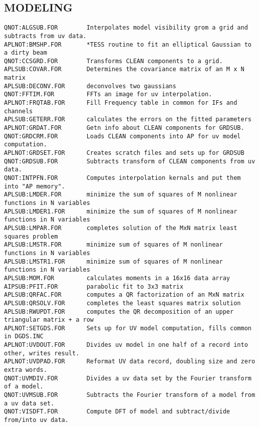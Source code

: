 \subsection{MODELING}
\begin{verbatim}
QNOT:ALGSUB.FOR        Interpolates model visibility grom a grid and subtracts from uv data.
APLNOT:BMSHP.FOR       *TESS routine to fit an elliptical Gaussian to a dirty beam
QNOT:CCSGRD.FOR        Transforms CLEAN components to a grid.
APLSUB:COVAR.FOR       Determines the covariance matrix of an M x N matrix
APLSUB:DECONV.FOR      deconvolves two gaussians
QNOT:FFTIM.FOR         FFTs an image for uv interpolation.
APLNOT:FRQTAB.FOR      Fill Frequency table in common for IFs and channels
APLSUB:GETERR.FOR      calculates the errors on the fitted parameters
APLNOT:GRDAT.FOR       Getn info about CLEAN components for GRDSUB.
QNOT:GRDCRM.FOR        Loads CLEAN components into AP for uv model computation.
APLNOT:GRDSET.FOR      Creates scratch files and sets up for GRDSUB
QNOT:GRDSUB.FOR        Subtracts transform of CLEAN components from uv data.
QNOT:INTPFN.FOR        Computes interpolation kernals and put them into "AP memory".
APLSUB:LMDER.FOR       minimize the sum of squares of M nonlinear functions in N variables
APLSUB:LMDER1.FOR      minimize the sum of squares of M nonlinear functions in N variables
APLSUB:LMPAR.FOR       completes solution of the MxN matrix least squares problem
APLSUB:LMSTR.FOR       minimize sum of squares of M nonlinear functions in N variables
APLSUB:LMSTR1.FOR      minimize sum of squares of M nonlinear functions in N variables
APLSUB:MOM.FOR         calculates moments in a 16x16 data array
AIPSUB:PFIT.FOR        parabolic fit to 3x3 matrix
APLSUB:QRFAC.FOR       computes a QR factorization of an MxN matrix
APLSUB:QRSOLV.FOR      completes the least squares matrix solution
APLSUB:RWUPDT.FOR      computes the QR decomposition of an upper triangular matrix + a row
APLNOT:SETGDS.FOR      Sets up for UV model computation, fills common in DGDS.INC
APLNOT:UVDOUT.FOR      Divides uv model in one half of a record into other, writes result.
APLNOT:UVDPAD.FOR      Reformat UV data record, doubling size and zero extra words.
QNOT:UVMDIV.FOR        Divides a uv data set by the Fourier transform of a model.
QNOT:UVMSUB.FOR        Subtracts the Fourier transform of a model from a uv data set.
QNOT:VISDFT.FOR        Compute DFT of model and subtract/divide from/into uv data.
\end{verbatim}
 
